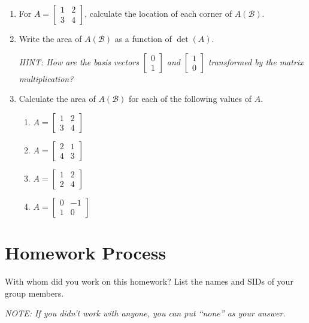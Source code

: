 \documentclass[10pt]{article}
\theoremstyle{definition}
\theoremstyle{plain}
\begin{document}
\begin{enumerate}[label=(\alph*)]
\item For $A = \begin{bmatrix} 1 & 2 \\ 3 & 4 \end{bmatrix}$, calculate the location of each corner of $A(\mathcal{B})$.

\item Write the area of $A(\mathcal{B})$ as a function of $\det(A)$.

\textit{HINT: How are the basis vectors $\begin{bmatrix} 0 \\ 1 \end{bmatrix}$ and $\begin{bmatrix} 1 \\ 0 \end{bmatrix}$ transformed by the matrix multiplication?}

\item Calculate the area of $A(\mathcal{B})$ for each of the following values of $A$.
\begin{enumerate}[label=\roman*.]
\item $A = \begin{bmatrix} 1 & 2 \\ 3 & 4 \end{bmatrix}$
\item $A = \begin{bmatrix} 2 & 1 \\ 4 & 3 \end{bmatrix}$
\item $A = \begin{bmatrix} 1 & 2 \\ 2 & 4 \end{bmatrix}$
\item $A = \begin{bmatrix} 0 & -1 \\ 1 & 0 \end{bmatrix}$
\end{enumerate}
\end{enumerate}

\section{Homework Process}

With whom did you work on this homework? List the names and SIDs of your group members.

\textit{NOTE: If you didn't work with anyone, you can put ``none'' as your answer.}
\end{document}
